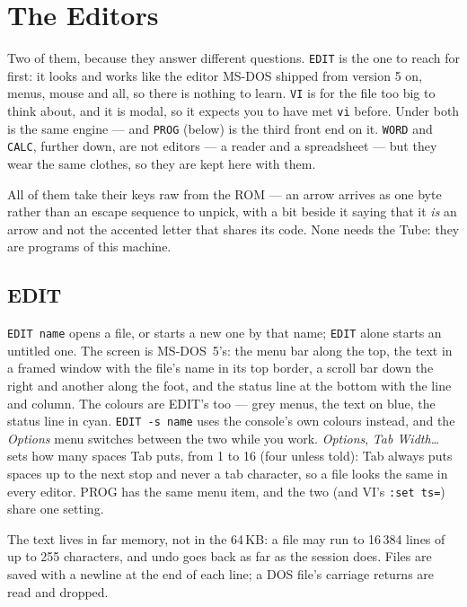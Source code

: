 \chapter{The Editors}\label{cha:editors}

Two of them, because they answer different questions. \verb|EDIT| is the
one to reach for first: it looks and works like the editor MS-DOS shipped
from version 5 on, menus, mouse and all, so there is nothing to learn.
\verb|VI| is for the file too big to think about, and it is modal, so it
expects you to have met \texttt{vi} before. Under both is the same engine
--- and \verb|PROG| (below) is the third front end on it. \verb|WORD| and
\verb|CALC|, further down, are not editors --- a reader and a spreadsheet
--- but they wear the same clothes, so they are kept here with them.

All of them take their keys raw from the ROM --- an arrow arrives as one
byte rather than an escape sequence to unpick, with a bit beside it saying
that it \emph{is} an arrow and not the accented letter that shares its
code. None needs the Tube: they are programs of this machine.

\section{EDIT}
\verb|EDIT name| opens a file, or starts a new one by that name; \verb|EDIT|
alone starts an untitled one. The screen is MS-DOS~5's: the menu bar along
the top, the text in a framed window with the file's name in its top
border, a scroll bar down the right and another along the foot, and the
status line at the bottom with the line and column. The colours are
EDIT's too --- grey menus, the text on blue, the status line in cyan.
\verb|EDIT -s name| uses the console's own colours instead, and the
\emph{Options} menu switches between the two while you work.
\emph{Options}, \emph{Tab Width\ldots} sets how many spaces Tab puts, from 1 to 16 (four
unless told): Tab always puts spaces up to the next stop and never a tab
character, so a file looks the same in every editor. PROG has the same menu
item, and the two (and VI's \texttt{:set ts=}) share one setting.

The text lives in far memory, not in the 64\,KB: a file may run to 16\,384
lines of up to 255 characters, and undo goes back as far as the session
does. Files are saved with a newline at the end of each line; a DOS file's
carriage returns are read and dropped.

